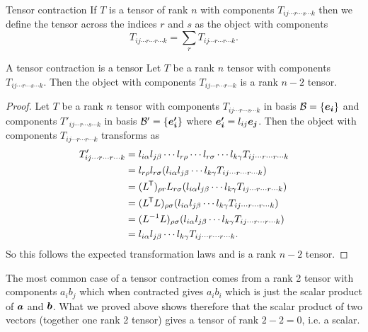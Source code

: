 \begin{definition}{Tensor contraction}{}
    If \(T\) is a tensor of rank \(n\) with components \(T_{ij\dotsm r\dotsm s\dotsm k}\) then we define the tensor  across the indices \(r\) and \(s\) as the object with components
    \[T_{ij\dotsm r\dotsm r\dotsm k} = \sum_{r} T_{ij\dotsm r\dotsm r\dotsm k}.\]
\end{definition}
\begin{lemma}{A tensor contraction is a tensor}{}
    Let \(T\) be a rank \(n\) tensor with components \(T_{ij\dotsm r\dotsm s\dotsm k}\).
    Then the object with components \(T_{ij\dotsm r\dotsm r\dotsm k}\) is a rank \(n - 2\) tensor.
\end{lemma}
\begin{proof}
    Let \(T\) be a rank \(n\) tensor with components \(T_{ij\dotsm r\dotsm s\dotsm k}\) in basis \(\mathcal{B} = \{\bm{e_{i}}\}\) and components \(T'_{ij\dotsm r\dotsm s\dotsm k}\) in basis \(\mathcal{B}' = \{\bm{e'_{i}}\}\) where \(\bm{e'_{i}} = l_{ij}\bm{e_{j}}\).
    Then the object with components \(T_{ij\dotsm r\dotsm r\dotsm k}\) transforms as
    \begin{align*}
        T'_{ij\dotsm r\dotsm r\dotsm k} &= l_{i\alpha}l_{j\beta}\dotsm l_{r\rho}\dotsm l_{r\sigma} \dotsm l_{k\gamma} T_{ij\dotsm r\dotsm r\dotsm k}\\
        &= l_{r\rho}l_{r\sigma}(l_{i\alpha}l_{j\beta}\dotsm l_{k\gamma}T_{ij\dotsm r\dotsm r\dotsm k})\\
        &= (L^{\mkern-1.5mu\mathsf{T}})_{\rho r}L_{r\sigma}(l_{i\alpha}l_{j\beta}\dotsm l_{k\gamma}T_{ij\dotsm r\dotsm r\dotsm k})\\
        &= (L^{\mkern-1.5mu\mathsf{T}} L)_{\rho\sigma} (l_{i\alpha}l_{j\beta}\dotsm l_{k\gamma}T_{ij\dotsm r\dotsm r\dotsm k})\\
        &= (L^{-1}L)_{\rho\sigma} (l_{i\alpha}l_{j\beta}\dotsm l_{k\gamma}T_{ij\dotsm r\dotsm r\dotsm k})\\
        &= l_{i\alpha}l_{j\beta}\dotsm l_{k\gamma}T_{ij\dotsm r\dotsm r\dotsm k}.
    \end{align*}
    So this follows the expected transformation laws and is a rank \(n - 2\) tensor.
\end{proof}
The most common case of a tensor contraction comes from a rank 2 tensor with components \(a_ib_j\) which when contracted gives \(a_ib_i\) which is just the scalar product of \(\bm{a}\) and \(\bm{b}\).
What we proved above shows therefore that the scalar product of two vectors (together one rank 2 tensor) gives a tensor of rank \(2 - 2 = 0\), i.e. a scalar.

